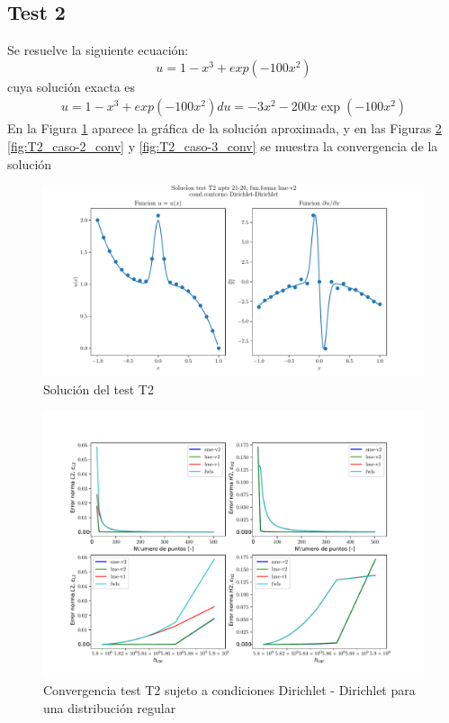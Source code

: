 \subsection{Test 2}
Se resuelve la siguiente ecuación:
\begin{equation}
    u = 1 - x^3 + exp( -100x^2 )
\end{equation}
cuya solución exacta es
\begin{eqnarray}
    u  = 1 - x^3 + exp(-100 x^2 )
    du = - 3 x^2 -200 x \exp(-100 x^2 )
\end{eqnarray}
En la Figura \ref{fig:T2_caso-1_sol} aparece la gráfica de la solución aproximada, y en las Figuras \ref{fig:T2_caso-1_conv} \ref{fig:T2_caso-2_conv} y \ref{fig:T2_caso-3_conv} se muestra la convergencia de la solución
\begin{figure}
    \centering
    \includegraphics[width=1\textwidth]{./Imagenes/06/solucion/T2_21-20_regular_type-2_caso-1_lme-v2_direct_dgesv-lapack-blas.pdf}
    \caption{Solución del test T2} \label{fig:T2_caso-1_sol}
\end{figure}
\begin{figure}
    \centering
    \includegraphics[width=1\textwidth]{./Imagenes/06/comparacion_shp_regular/T2_regular_type-2_caso-1_direct_dgesv-lapack-blas_sme-v2_lme-v2_lme-v1_fwls.pdf}
    \caption{Convergencia test T2 sujeto a condiciones Dirichlet - Dirichlet para una distribución regular} \label{fig:T2_caso-1_conv}
\end{figure}
